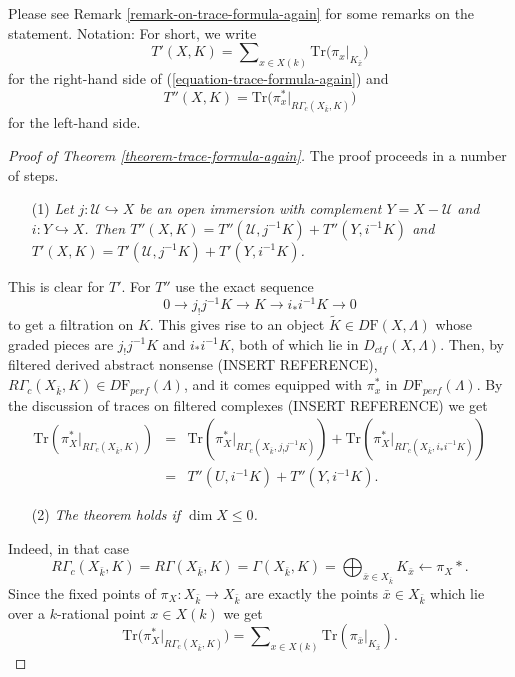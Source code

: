 \noindent
Please see Remark \ref{remark-on-trace-formula-again} for some remarks
on the statement. Notation: For short, we write
$$
T'(X, K) =
\sum\nolimits_{x\in X(k)}
\text{Tr}\big(\pi_x\big|_{K_{\bar x}}\big)
$$
for the right-hand side of (\ref{equation-trace-formula-again}) and
$$
T''(X, K)
=\text{Tr}\big(\pi_x^*\big|_{R\Gamma_c(X_{\bar k}, K)}\big)
$$
for the left-hand side.

\begin{proof}[Proof of Theorem \ref{theorem-trace-formula-again}]
The proof proceeds in a number of steps.
\begin{enumerate}
\item[(1)]
{\it Let $j: \mathcal{U}\hookrightarrow X$ be an open immersion with complement
$Y = X - \mathcal{U}$ and $i: Y \hookrightarrow X$. Then
$T''(X, K) = T''(\mathcal{U}, j^{-1} K)+ T''(Y, i^{-1}K)$ and
$T'(X, K) = T'(\mathcal{U}, j^{-1} K)+ T'(Y, i^{-1}K)$.}
\end{enumerate}
This is clear for $T'$. For $T''$ use the exact sequence
$$
0\to j_!j^{-1} K \to K \to i_* i^{-1} K \to 0
$$
to get a filtration on $K$. This gives rise to an object
$\widetilde K \in D\mathrm{F}(X, \Lambda)$
whose graded pieces are $j_!j^{-1}K$ and $i_*i^{-1}K$,
both of which lie in $D_{ctf}(X, \Lambda)$. Then, by filtered derived
abstract nonsense (INSERT REFERENCE),
$R\Gamma_c(X_{\bar k}, K)\in D\mathrm{F}_{perf}(\Lambda)$,
and it comes equipped with $\pi_x^*$ in
$D\mathrm{F}_{perf}(\Lambda)$.
By the discussion of traces on filtered complexes (INSERT REFERENCE) we get
\begin{eqnarray*}
\text{Tr}\left(\pi_X^*\big|_{R\Gamma_c(X_{\bar k}, K)}\right)
& = & \text{Tr}\left(\pi_X^*\big|_{R\Gamma_c(X_{\bar k}, j_!j^{-1}K)}\right)+
\text{Tr}\left(\pi_X^*\big|_{R\Gamma_c(X_{\bar k}, i_*i^{-1}K)}\right)
\\
& = & T''(U, i^{-1}K) + T''(Y, i^{-1}K).
\end{eqnarray*}
\begin{enumerate}
\item[(2)]
{\it The theorem holds if $\dim X\leq 0$. }
\end{enumerate}
Indeed, in that case
$$
R\Gamma_c(X_{\bar k}, K) = R\Gamma(X_{\bar k}, K) = \Gamma(X_{\bar k}, K) =
\bigoplus_{\bar x\in X_{\bar k}} K_{\bar x} \leftarrow \pi_X*.
$$
Since the fixed points of $\pi_X: X_{\bar k}\to X_{\bar k}$ are exactly the
points $\bar x\in X_{\bar k}$ which lie over a $k$-rational point $x\in X(k)$
we get
$$
\text{Tr}\big(\pi_X^*|_{R\Gamma_c(X_{\bar k}, K)}\big) =
\sum\nolimits_{x\in X(k)}\text{Tr}(\pi_{\bar x}|_{K_{\bar x}}).
$$
\end{proof}
